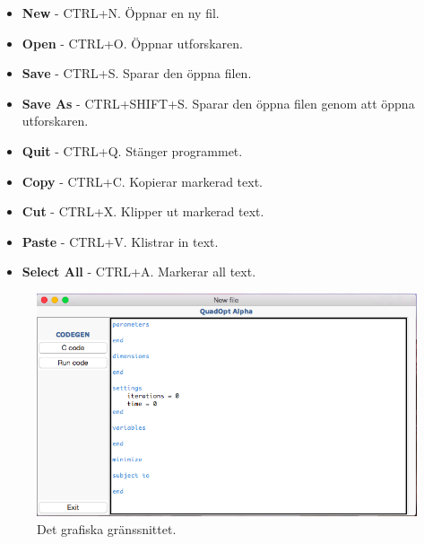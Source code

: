 \begin{itemize}
	\item \textbf{New} - CTRL+N. Öppnar en ny fil. 
	\item \textbf{Open} - CTRL+O. Öppnar utforskaren. 
	\item \textbf{Save} - CTRL+S. Sparar den öppna filen.
	\item \textbf{Save As} - CTRL+SHIFT+S. Sparar den öppna filen genom att öppna utforskaren.
	\item \textbf{Quit} - CTRL+Q. Stänger programmet.
	\item \textbf{Copy} - CTRL+C. Kopierar markerad text.
	\item \textbf{Cut} - CTRL+X. Klipper ut markerad text.
	\item \textbf{Paste} - CTRL+V. Klistrar in text.
	\item \textbf{Select All} - CTRL+A. Markerar all text.
\end{itemize}

\begin{figure}[H]
\includegraphics[scale=0.52]{bilder/macgui.png}
\caption{Det grafiska gränssnittet.}
\label{fig:gui}
\end{figure}